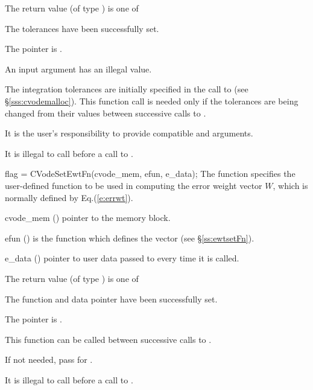 {
  The return value  (of type ) is one of
  \begin{args}
  \item[\Id{CV\_SUCCESS}] 
    The tolerances have been successfully set.
  \item[\Id{CV\_MEM\_NULL}]
    The  pointer is .
  \item[\Id{CV\_ILL\_INPUT}]
    An input argument has an illegal value.
  \end{args}
}
{
  The integration tolerances are initially specified in the call
  to  (see \S\ref{sss:cvodemalloc}). This function call is
  needed only if the tolerances are being changed from their values between
  successive calls to .

  {\warn} It is the user's responsibility to provide compatible  and
   arguments.

  {\warn} It is illegal to call  before a call to .
}
{
flag = CVodeSetEwtFn(cvode\_mem, efun, e\_data);
}
{
  The function  specifies the user-defined function
  to be used in computing the error weight vector $W$, which is normally
  defined by Eq.(\ref{e:errwt}).
}
{
  \begin{args}
  \item[cvode\_mem] ()
    pointer to the {\cvodes} memory block.
  \item[efun] () 
    is the {\C} function which defines the  vector (see \S\ref{ss:ewtsetFn}).
  \item[e\_data] ()
    pointer to user data passed to  every time it is called.
  \end{args}
}
{
  The return value  (of type ) is one of
  \begin{args}
  \item[\Id{CV\_SUCCESS}] 
    The function  and data pointer  have been successfully set.
  \item[\Id{CV\_MEM\_NULL}]
    The  pointer is .
  \end{args}
}
{
  This function can be called between successive calls to .

  If not needed, pass  for .

  {\warn} It is illegal to call  before a call to .
}

